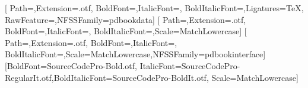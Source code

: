   \let\pddisplayface\pdtextface
  \newfontfamily\pdcaptionface{\pdbookregular}[
    Path=\pdbookfontdir,Extension=.otf,
    BoldFont=\pdbookbold,ItalicFont=\pdbookitalic,
    BoldItalicFont=\pdbookbolditalic,Ligatures=TeX,
    RawFeature={\pdbookdatafeatures},NFSSFamily=pdbookdata]
  \setsansfont{\pdbookregular}[
    Path=\pdbookfontdir,Extension=.otf,
    BoldFont=\pdbookbold,ItalicFont=\pdbookitalic,
    BoldItalicFont=\pdbookbolditalic,Scale=MatchLowercase]
  \newfontfamily\pdinterfaceface{\pdbookregular}[
    Path=\pdbookfontdir,Extension=.otf,
    BoldFont=\pdbookbold,ItalicFont=\pdbookitalic,
    BoldItalicFont=\pdbookbolditalic,Scale=MatchLowercase,NFSSFamily=pdbookinterface]
  \setmonofont{SourceCodePro-Regular.otf}[BoldFont=SourceCodePro-Bold.otf,
    ItalicFont=SourceCodePro-RegularIt.otf,BoldItalicFont=SourceCodePro-BoldIt.otf,
    Scale=MatchLowercase]
  \renewcommand{\pdgrotesk}{\pdtextface}
  \renewcommand{\pdpartface}{\pddisplayface}
\fi\fi
\providecommand{\pdtextface}{\rmfamily}
\providecommand{\pddisplayface}{\pdgrotesk}
\providecommand{\pdcaptionface}{\rmfamily}
\providecommand{\pdinterfaceface}{\sffamily}
\providecommand{\pdcovergrotesk}{\pdgrotesk}

